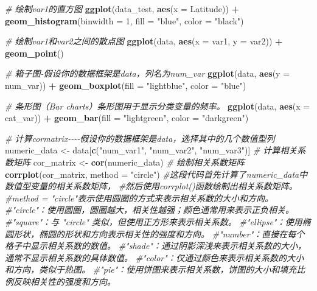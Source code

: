 \documentclass[
]{article}
\newenvironment{Shaded}{\begin{snugshade}}{\end{snugshade}}
\newcommand{\AttributeTok}[1]{\textcolor[rgb]{0.13,0.29,0.53}{#1}}
\newcommand{\CommentTok}[1]{\textcolor[rgb]{0.56,0.35,0.01}{\textit{#1}}}
\newcommand{\DecValTok}[1]{\textcolor[rgb]{0.00,0.00,0.81}{#1}}
\newcommand{\FunctionTok}[1]{\textcolor[rgb]{0.13,0.29,0.53}{\textbf{#1}}}
\newcommand{\NormalTok}[1]{#1}
\newcommand{\OtherTok}[1]{\textcolor[rgb]{0.56,0.35,0.01}{#1}}
\newcommand{\SpecialCharTok}[1]{\textcolor[rgb]{0.81,0.36,0.00}{\textbf{#1}}}
\newcommand{\StringTok}[1]{\textcolor[rgb]{0.31,0.60,0.02}{#1}}
\begin{document}
\begin{Shaded}
\begin{Highlighting}[]
\CommentTok{\# 绘制var1的直方图}
\FunctionTok{ggplot}\NormalTok{(data\_test, }\FunctionTok{aes}\NormalTok{(}\AttributeTok{x =}\NormalTok{ Latitude)) }\SpecialCharTok{+} 
  \FunctionTok{geom\_histogram}\NormalTok{(}\AttributeTok{binwidth =} \DecValTok{1}\NormalTok{, }\AttributeTok{fill =} \StringTok{"blue"}\NormalTok{, }\AttributeTok{color =} \StringTok{"black"}\NormalTok{)}

\CommentTok{\# 绘制var1和var2之间的散点图}
\FunctionTok{ggplot}\NormalTok{(data, }\FunctionTok{aes}\NormalTok{(}\AttributeTok{x =}\NormalTok{ var1, }\AttributeTok{y =}\NormalTok{ var2)) }\SpecialCharTok{+} 
  \FunctionTok{geom\_point}\NormalTok{()}

\CommentTok{\# 箱子图{-}假设你的数据框架是data，列名为num\_var}
\FunctionTok{ggplot}\NormalTok{(data, }\FunctionTok{aes}\NormalTok{(}\AttributeTok{y =}\NormalTok{ num\_var)) }\SpecialCharTok{+} 
    \FunctionTok{geom\_boxplot}\NormalTok{(}\AttributeTok{fill =} \StringTok{"lightblue"}\NormalTok{, }\AttributeTok{color =} \StringTok{"blue"}\NormalTok{)}

\CommentTok{\# 条形图（Bar charts）条形图用于显示分类变量的频率。}
\FunctionTok{ggplot}\NormalTok{(data, }\FunctionTok{aes}\NormalTok{(}\AttributeTok{x =}\NormalTok{ cat\_var)) }\SpecialCharTok{+} 
    \FunctionTok{geom\_bar}\NormalTok{(}\AttributeTok{fill =} \StringTok{"lightgreen"}\NormalTok{, }\AttributeTok{color =} \StringTok{"darkgreen"}\NormalTok{)}

\CommentTok{\# 计算cormatrix{-}{-}{-}{-}假设你的数据框架是data，选择其中的几个数值型列}
\NormalTok{numeric\_data }\OtherTok{\textless{}{-}}\NormalTok{ data[}\FunctionTok{c}\NormalTok{(}\StringTok{"num\_var1"}\NormalTok{, }\StringTok{"num\_var2"}\NormalTok{, }\StringTok{"num\_var3"}\NormalTok{)]}
\CommentTok{\# 计算相关系数矩阵}
\NormalTok{cor\_matrix }\OtherTok{\textless{}{-}} \FunctionTok{cor}\NormalTok{(numeric\_data)}
\CommentTok{\# 绘制相关系数矩阵}
\FunctionTok{corrplot}\NormalTok{(cor\_matrix, }\AttributeTok{method =} \StringTok{"circle"}\NormalTok{)}
\CommentTok{\#这段代码首先计算了numeric\_data中数值型变量的相关系数矩阵，}
\CommentTok{\#然后使用corrplot()函数绘制出相关系数矩阵。}
\CommentTok{\#method = "circle"表示使用圆圈的方式来表示相关系数的大小和方向。}
\CommentTok{\#"circle"：使用圆圈，圆圈越大，相关性越强；颜色通常用来表示正负相关。}
\CommentTok{\#"square"：与 "circle" 类似，但使用正方形来表示相关系数。}
\CommentTok{\#"ellipse"：使用椭圆形状，椭圆的形状和方向表示相关性的强度和方向。}
\CommentTok{\#"number"：直接在每个格子中显示相关系数的数值。}
\CommentTok{\#"shade"：通过阴影深浅来表示相关系数的大小，通常不显示相关系数的具体数值。}
\CommentTok{\#"color"：仅通过颜色来表示相关系数的大小和方向，类似于热图。}
\CommentTok{\#"pie"：使用饼图来表示相关系数，饼图的大小和填充比例反映相关性的强度和方向。}
\end{Highlighting}
\end{Shaded}
\end{document}
